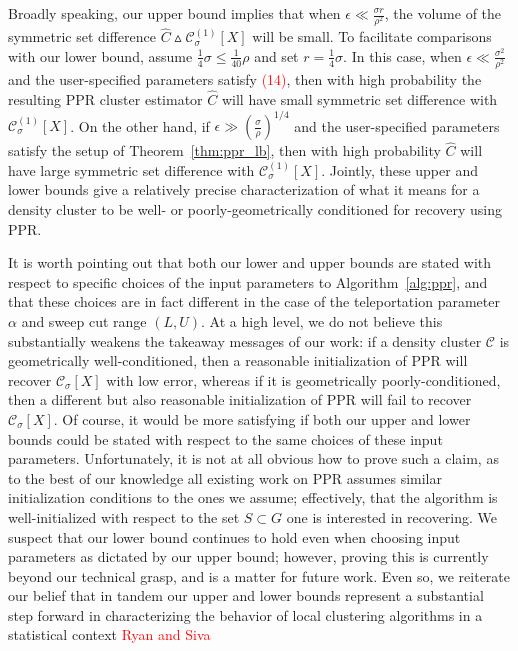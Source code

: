 \documentclass[11pt,twoside]{article}
\newcommand{\1}{\mathbf{1}}
\newcommand{\Xbf}{X}             %
\newcommand{\Cset}{\mathcal{C}}
\newcommand{\Csig}{\Cset_{\sigma}}
\begin{document}
Broadly speaking, our upper bound implies that when $\epsilon \ll \frac{\sigma r}{\rho^2}$, the volume of the symmetric set difference $\widehat{C} \vartriangle \Csig^{(1)}[\Xbf]$ will be small. To facilitate comparisons with our lower bound, assume $\frac{1}{4}\sigma \leq \frac{1}{40}\rho$ and set $r = \frac{1}{4}\sigma$. In this case, when $\epsilon \ll \frac{\sigma^2}{\rho^2}$ and the user-specified parameters satisfy \textcolor{red}{(14)}, then with high probability the resulting PPR cluster estimator $\widehat{C}$ will have small symmetric set difference with $\Csig^{(1)}[\Xbf]$. On the other hand, if $\epsilon \gg \left(\frac{\sigma}{\rho}\right)^{1/4}$ and the user-specified parameters satisfy the setup of Theorem~\ref{thm:ppr_lb}, then with high probability $\widehat{C}$ will have large symmetric set difference with $\Csig^{(1)}[\Xbf]$. Jointly, these upper and lower bounds give a relatively precise characterization of what it means for a density cluster to be well- or poorly-geometrically conditioned for recovery using PPR.

It is worth pointing out that both our lower and upper bounds are stated with respect to specific choices of the input parameters to Algorithm~\ref{alg:ppr}, and that these choices are in fact different in the case of the teleportation parameter $\alpha$ and sweep cut range $(L,U)$. At a high level, we do not believe this substantially weakens the takeaway messages of our work: if a density cluster $\mathcal{C}$ is geometrically well-conditioned, then a reasonable initialization of PPR will recover $\Csig[\Xbf]$ with low error, whereas if it is geometrically poorly-conditioned, then a different but also reasonable initialization of PPR will fail to recover $\Csig[\Xbf]$. Of course, it would be more satisfying if both our upper and lower bounds could be stated with respect to the same choices of these input parameters. Unfortunately, it is not at all obvious how to prove such a claim, as to the best of our knowledge all existing work on PPR assumes similar initialization conditions to the ones we assume; effectively, that the algorithm is well-initialized with respect to the set $S \subset G$ one is interested in recovering. We suspect that our lower bound continues to hold even when choosing input parameters as dictated by our upper bound; however, proving this is currently beyond our technical grasp, and is a matter for future work. Even so, we reiterate our belief that in tandem our upper and lower bounds represent a substantial step forward in characterizing the behavior of local clustering algorithms in a statistical context \textcolor{red}{Ryan and Siva} 
\end{document}
